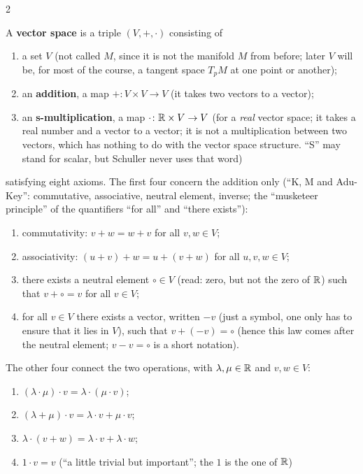 \begin{paracol}{2}
\begin{definition}\label{def:c03-vs}
A \textbf{vector space} is a triple $(V,+,\cdot)$ consisting of
\begin{enumerate}
  \item a set $V$ (not called $M$, since it is not the manifold $M$ from before; later $V$ will be, for most of the course, a tangent space $T_pM$ at one point or another);
  \item an \textbf{addition}, a map $+\colon V\times V\to V$ (it takes two vectors to a vector);
  \item an \textbf{s-multiplication}, a map $\cdot\colon\mathbb{R}\times V\to V$ (for a \emph{real} vector space; it takes a real number and a vector to a vector; it is not a multiplication between two vectors, which has nothing to do with the vector space structure.
        ``S'' may stand for scalar, but Schuller never uses that word)
\end{enumerate}
satisfying eight axioms. The first four concern the addition only (``K, M and Adu-Key'': commutative, associative, neutral element, inverse; the ``musketeer principle'' of the quantifiers ``for all'' and ``there exists''):
\begin{enumerate}
  \item[(a1)] commutativity: $v+w=w+v$ for all $v,w\in V$;
  \item[(a2)] associativity: $(u+v)+w=u+(v+w)$ for all $u,v,w\in V$;
  \item[(a3)] there exists a neutral element $\circ\in V$ (read: zero, but not the zero of $\mathbb{R}$) such that $v+\circ=v$ for all $v\in V$;
  \item[(a4)] for all $v\in V$ there exists a vector, written $-v$ (just a symbol, one only has to ensure that it lies in $V$), such that $v+(-v)=\circ$ (hence this law comes after the neutral element; $v-v=\circ$ is a short notation).
\end{enumerate}
The other four connect the two operations, with $\lambda,\mu\in\mathbb{R}$ and $v,w\in V$:
\begin{enumerate}
  \item[(s1)] $(\lambda\cdot\mu)\cdot v=\lambda\cdot(\mu\cdot v)$;
  \item[(s2)] $(\lambda+\mu)\cdot v=\lambda\cdot v+\mu\cdot v$;
  \item[(s3)] $\lambda\cdot(v+w)=\lambda\cdot v+\lambda\cdot w$;
  \item[(s4)] $1\cdot v=v$ (``a little trivial but important''; the $1$ is the one of $\mathbb{R}$)
\end{enumerate}

\end{definition}
\end{paracol}
